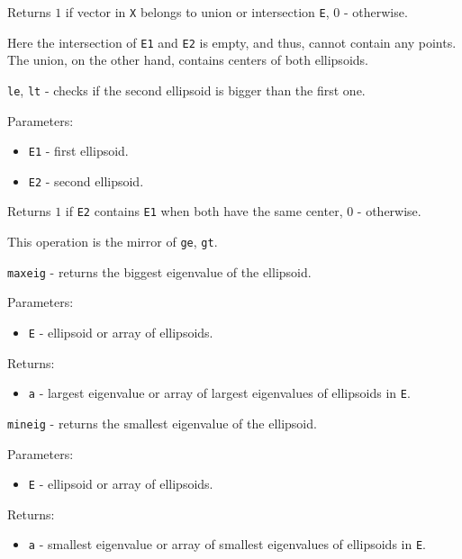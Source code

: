 \documentclass{report}
\begin{document}
Returns $1$ if vector in {\tt X} belongs to union or intersection {\tt E},
$0$ - otherwise.



Here the intersection of {\tt E1} and {\tt E2} is empty, and thus, cannot
contain any points. The union, on the other hand, contains centers
of both ellipsoids.

\newpage

{\Large {\tt le}}, {\Large {\tt lt}} - checks if the second ellipsoid is bigger
than the first one.

Parameters:
\begin{itemize}
\item {\tt E1} - first ellipsoid.
\item {\tt E2} - second ellipsoid.
\end{itemize}

Returns $1$ if {\tt E2} contains {\tt E1} when both have the same center,
$0$ - otherwise.

This operation is the mirror of {\tt ge}, {\tt gt}.

\newpage

{\Large {\tt maxeig}} - returns the biggest eigenvalue of the ellipsoid.

Parameters:
\begin{itemize}
\item {\tt E} - ellipsoid or array of ellipsoids.
\end{itemize}

Returns:
\begin{itemize}
\item {\tt a} - largest eigenvalue or array of largest eigenvalues of
ellipsoids in {\tt E}.
\end{itemize}

\newpage

{\Large {\tt mineig}} - returns the smallest eigenvalue of the ellipsoid.

Parameters:
\begin{itemize}
\item {\tt E} - ellipsoid or array of ellipsoids.
\end{itemize}

Returns:
\begin{itemize}
\item {\tt a} - smallest eigenvalue or array of smallest eigenvalues of
ellipsoids in {\tt E}.
\end{itemize}

\newpage
\end{document}
